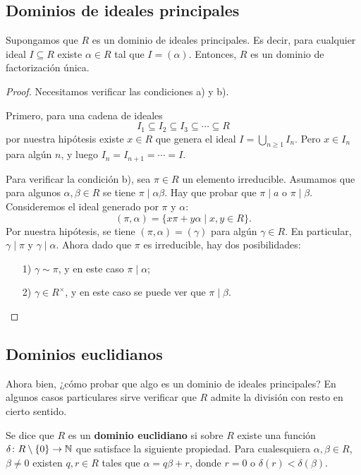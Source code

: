 \subsection{Dominios de ideales principales}

\begin{proposicion}
  Supongamos que $R$ es un dominio de ideales principales. Es decir, para
  cualquier ideal $I \subseteq R$ existe $\alpha \in R$ tal que
  $I = (\alpha)$. Entonces, $R$ es un dominio de factorización única.

  \begin{proof}
    Necesitamos verificar las condiciones a) y b).

    Primero, para una cadena de ideales
    $$I_1 \subseteq I_2 \subseteq I_3 \subseteq \cdots \subseteq R$$
    por nuestra hipótesis existe $x \in R$ que genera el ideal
    $I = \bigcup_{n\ge 1} I_n$. Pero $x \in I_n$ para algún $n$, y luego
    $I_n = I_{n+1} = \cdots = I$.

    Para verificar la condición b), sea $\pi\in R$ un elemento
    irreducible. Asumamos que para algunos $\alpha,\beta\in R$ se tiene
    $\pi \mid \alpha\beta$. Hay que probar que $\pi \mid a$ o
    $\pi \mid \beta$. Consideremos el ideal generado por $\pi$ y $\alpha$:
    $$(\pi,\alpha) = \{ x\pi + y\alpha \mid x,y\in R \}.$$
    Por nuestra hipótesis, se tiene $(\pi,\alpha) = (\gamma)$ para algún
    $\gamma\in R$. En particular, $\gamma \mid \pi$ y $\gamma \mid \alpha$.
    Ahora dado que $\pi$ es irreducible, hay dos posibilidades:
    \begin{enumerate}
    \item[1)] $\gamma \sim \pi$, y en este caso $\pi \mid \alpha$;

    \item[2)] $\gamma \in R^\times$, y en este caso se puede ver que
      $\pi\mid\beta$. \qedhere
    \end{enumerate}
  \end{proof}
\end{proposicion}

\subsection{Dominios euclidianos}

Ahora bien, ¿cómo probar que algo es un dominio de ideales principales? En
algunos casos particulares sirve verificar que $R$ admite la división con resto
en cierto sentido.

\begin{definicion}
  Se dice que $R$ es un \textbf{dominio euclidiano} si sobre $R$ existe una
  función $\delta\colon R\setminus \{0\} \to \mathbb{N}$ que satisface la siguiente
  propiedad. Para cualesquiera $\alpha,\beta\in R$, $\beta\ne 0$ existen
  $q,r\in R$ tales que $\alpha = q\beta + r$, donde $r = 0$ o
  $\delta (r) < \delta (\beta)$.
\end{definicion}

